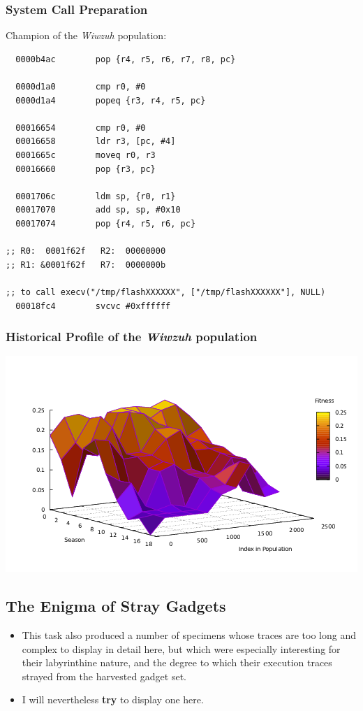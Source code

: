 \documentclass[11pt]{article}
\begin{document}
\subsubsection*{System Call Preparation}
\label{sec:org4bf21c1}

Champion of the \emph{Wiwzuh} population:
\lstset{language=asm,label= ,caption= ,captionpos=b,numbers=none}
\begin{lstlisting}
  0000b4ac        pop {r4, r5, r6, r7, r8, pc}

  0000d1a0        cmp r0, #0
  0000d1a4        popeq {r3, r4, r5, pc}

  00016654        cmp r0, #0
  00016658        ldr r3, [pc, #4]
  0001665c        moveq r0, r3
  00016660        pop {r3, pc}

  0001706c        ldm sp, {r0, r1}
  00017070        add sp, sp, #0x10
  00017074        pop {r4, r5, r6, pc}

;; R0:  0001f62f   R2:  00000000
;; R1: &0001f62f   R7:  0000000b

;; to call execv("/tmp/flashXXXXXX", ["/tmp/flashXXXXXX"], NULL) 
  00018fc4        svcvc #0xffffff
\end{lstlisting}

\subsubsection*{Historical Profile of the \emph{Wiwzuh} population}
\label{sec:orgd0271fc}
\begin{center}
\includegraphics[width=.9\linewidth]{./img/wiwzuh_syscall_gaussian_3.png}
\end{center}

\subsection*{The Enigma of Stray Gadgets}
\label{sec:org870b934}
\begin{itemize}
\item This task also produced a number of specimens whose traces are too long and complex to display in detail here, but which were especially interesting for their labyrinthine nature, and the degree to which their execution traces strayed from the harvested gadget set.
\item I will nevertheless \textbf{try} to display one here.
\end{itemize}
\end{document}
